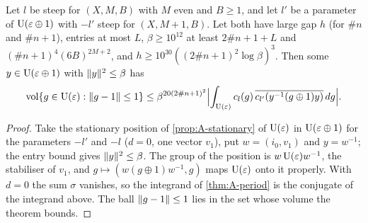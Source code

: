 \begin{theorem}[Restriction]\label{thm:A-restriction}
Let $l$ be steep for $(X,M,B)$ with $M$ even and $B\ge1$, and let $l'$ be a parameter of $\operatorname{U}(\varepsilon\oplus1)$ with $-l'$ steep for $(X,M+1,B)$. Let both have large gap $h$ (for $\#n$ and $\#n+1$), entries at most $L$, $\beta\ge10^{12}$ at least
$2\#n+1+L$ and $(\#n+1)^4(6B)^{2M+2}$, and $h\ge10^{30}((2\#n+1)^2\log\beta)^3$. Then some $y\in\operatorname{U}(\varepsilon\oplus1)$ with $\lVert y\rVert^2\le\beta$ has
\[
  \operatorname{vol}\{g\in\operatorname{U}(\varepsilon):\lVert g-1\rVert\le1\}\le\beta^{20(2\#n+1)^2}\Bigl\lvert\int_{\operatorname{U}(\varepsilon)}c_l(g)\,\overline{c_{l'}(y^{-1}(g\oplus1)y)}\,dg\Bigr\rvert.
\]
\end{theorem}

\begin{proof}
Take the stationary position of \cref{prop:A-stationary} of $\operatorname{U}(\varepsilon)$ in $\operatorname{U}(\varepsilon\oplus1)$ for the parameters $-l'$ and $-l$ ($d=0$, one vector $v_1$), put $w=(i_0,v_1)$ and $y=w^{-1}$; the entry bound gives $\lVert y\rVert^2\le\beta$. The group of the position is
$w\operatorname{U}(\varepsilon)w^{-1}$, the stabiliser of $v_1$, and $g\mapsto(w(g\oplus1)w^{-1},g)$ maps $\operatorname{U}(\varepsilon)$ onto it properly. With $d=0$ the sum $\sigma$ vanishes, so the integrand of \cref{thm:A-period} is the conjugate of the integrand above. The ball
$\lVert g-1\rVert\le1$ lies in the set whose volume the theorem bounds.
\end{proof}
